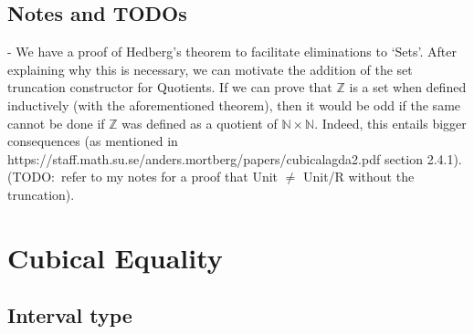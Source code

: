 \documentclass[12pt,twoside,maitrise]{dms}
\theoremstyle{definition}
\numberwithin{equation}{section}
\numberwithin{table}{chapter}
\numberwithin{figure}{chapter}
\begin{document}
\section{Notes and TODOs}
- We have a proof of Hedberg's theorem to facilitate eliminations to `Sets'.
After explaining why this is necessary, we can motivate the addition of the set
truncation constructor for Quotients. If we can prove that $\mathbb{Z}$ is a set
when defined inductively (with the aforementioned theorem), then it would be odd
if the same cannot be done if $\mathbb{Z}$ was defined as a quotient of
$\mathbb{N} \times \mathbb{N}$. Indeed, this entails bigger consequences (as
mentioned in https://staff.math.su.se/anders.mortberg/papers/cubicalagda2.pdf
section 2.4.1). (TODO:\ refer to my notes for a proof that Unit $\ne$ Unit/R
without the truncation).



\chapter{Cubical Equality}\label{ch:cubical-equality}
\section{Interval type}
\end{document}
